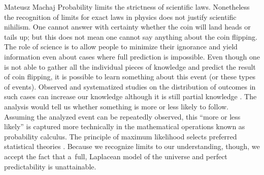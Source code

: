 \begin{artengenv}{Mateusz Machaj}
Probability limits the strictness of scientific laws. Nonetheless the recognition of limits for exact laws in physics does not justify scientific nihilism. One cannot answer with certainty whether the coin will land heads or tails up; but this does not mean one cannot say anything about the coin flipping. The role of science is to allow people to minimize their ignorance and yield information even about cases where full prediction is impossible. Even though one is not able to gather all the individual pieces of knowledge and predict the result of coin flipping, it is possible to learn something about this event (or these types of events). Observed and systematized studies on the distribution of outcomes in such cases can increase our knowledge although it is still partial knowledge 
\parencite[][p.254]{kyburg_probability_1966}. %
 The analysis would tell us whether something is more or less likely to follow. Assuming the analyzed event can be repeatedly observed, this ``more or less likely'' is captured more technically in the mathematical operations known as probability calculus. The principle of maximum likelihood selects preferred statistical theories 
\parencite[][p.328]{swinburne_probability_1971}. %
 Because we recognize limits to our understanding, though, we accept the fact that a~full, Laplacean model of the universe and perfect predictability is unattainable.




\end{artengenv}
